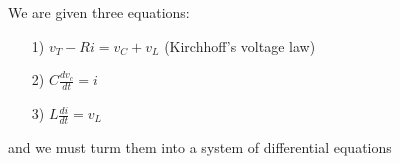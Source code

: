 \documentclass[preview]{standalone}
\begin{document}
\begin{center}
We are given three equations: 
                \begin{enumerate}
                    \item[1)] $v_T - Ri = v_C + v_L$ (Kirchhoff’s voltage law)
                    \item[2)] $C\frac{dv_c}{dt} = i$
                    \item[3)] $L\frac{di}{dt} = v_L$
                \end{enumerate}
                   
                   
                and we must turm them into a system of differential equations
\end{center}
\end{document}
